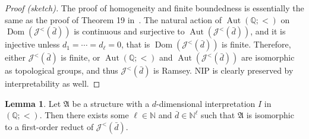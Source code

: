 \documentclass{amsart}
\theoremstyle{definition}
\newtheorem{lemma}[theorem]{Lemma}
\theoremstyle{remark}
\numberwithin{equation}{section}
\newcommand{\aut}{\operatorname{Aut}}
\newcommand{\dom}{\operatorname{Dom}}
\newcommand\johnord[1]{\mathcal{J}^{<}(#1)}
\newcommand{\fa}{\mathfrak{A}}
\begin{document}
\begin{proof}[Proof (sketch)]
	The proof of homogeneity and finite boundedness is essentially the same as the proof of Theorem 19 in~\cite{bodirsky2025structures}. 
    The natural action of $\aut(\mathbb{Q};<)$ on $\dom(\johnord{\bar{d}})$ is continuous and surjective to $\aut(\johnord{\bar{d}})$, {and it is injective unless $d_1=\cdots=d_{\ell}=0$, that is $\dom(\johnord{\bar{d}})$ is finite.} Therefore, {either $\johnord{\bar{d}}$ is finite, or} $\aut(\mathbb{Q}{;<})$ and $\aut(\johnord{\bar{d}})$ are isomorphic as topological groups, and thus $\johnord{\bar{d}}$ is Ramsey.
    NIP is clearly preserved by interpretability as well.
\end{proof}


\begin{lemma}\label{nice_reducts}
    Let $\fa$ be a structure with a $d$-dimensional interpretation $I$ in $({\mathbb Q};<)$. Then there exists some $\ell\in \mathbb{N}$ and $\bar{d}\in {\mathbb N}^{\ell}$ such that $\fa$ is isomorphic to a first-order reduct of $\johnord{\bar{d}}$.
\end{lemma}
\end{document}
